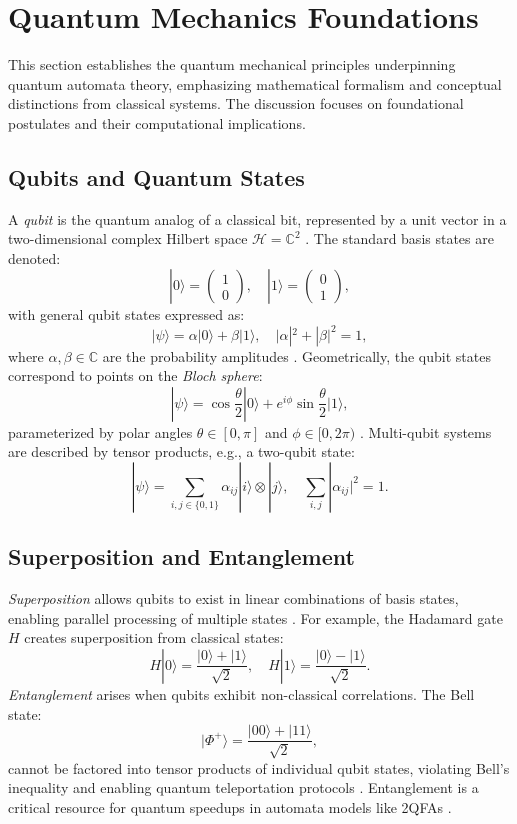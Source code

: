 \section{Quantum Mechanics Foundations}
\label{sec:quantum-foundations}

This section establishes the quantum mechanical principles underpinning quantum automata theory, emphasizing mathematical formalism and conceptual distinctions from classical systems. The discussion focuses on foundational postulates and their computational implications.

\subsection{Qubits and Quantum States}
\label{subsec:qubits}

A \textit{qubit} is the quantum analog of a classical bit, represented by a unit vector in a two-dimensional complex Hilbert space $\mathcal{H} = \mathbb{C}^2$ \cite{nielsen2010quantum}. The standard basis states are denoted:
\[
|0\rangle = \begin{pmatrix} 1 \\ 0 \end{pmatrix}, \quad |1\rangle = \begin{pmatrix} 0 \\ 1 \end{pmatrix},
\]
with general qubit states expressed as:
\[
|\psi\rangle = \alpha|0\rangle + \beta|1\rangle, \quad |\alpha|^2 + |\beta|^2 = 1,
\]
where $\alpha, \beta \in \mathbb{C}$ are the probability amplitudes \cite{nielsen2010quantum}. Geometrically, the qubit states correspond to points on the \textit{Bloch sphere}:
\[
|\psi\rangle = \cos\frac{\theta}{2}|0\rangle + e^{i\phi}\sin\frac{\theta}{2}|1\rangle,
\]
parameterized by polar angles $\theta \in [0, \pi]$ and $\phi \in [0, 2\pi)$ \cite{nielsen2010quantum}. Multi-qubit systems are described by tensor products, e.g., a two-qubit state:
\[
|\psi\rangle = \sum_{i,j \in \{0,1\}} \alpha_{ij}|i\rangle \otimes |j\rangle, \quad \sum_{i,j} |\alpha_{ij}|^2 = 1.
\]

\subsection{Superposition and Entanglement}
\label{subsec:superposition}

\textit{Superposition} allows qubits to exist in linear combinations of basis states, enabling parallel processing of multiple states \cite{nielsen2010quantum}. For example, the Hadamard gate $H$ creates superposition from classical states:
\[
H|0\rangle = \frac{|0\rangle + |1\rangle}{\sqrt{2}}, \quad H|1\rangle = \frac{|0\rangle - |1\rangle}{\sqrt{2}}.
\]
\textit{Entanglement} arises when qubits exhibit non-classical correlations. The Bell state:
\[
|\Phi^+\rangle = \frac{|00\rangle + |11\rangle}{\sqrt{2}},
\]
cannot be factored into tensor products of individual qubit states, violating Bell's inequality and enabling quantum teleportation protocols \cite{nielsen2010quantum}. Entanglement is a critical resource for quantum speedups in automata models like 2QFAs \cite{ambainis2009superiority}.

